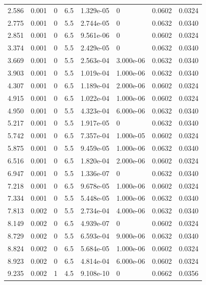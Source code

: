 \documentclass[preview]{standalone}
\begin{document}
{{\begin{tabular}{L{1.2cm}C{1.2cm} C{0.3cm}C{0.5cm} C{1.4cm}C{1.4cm} C{1.4cm}C{1.4cm}}
  2.586  &  0.001  & 0     & 6.5 &  1.329e-05  & 0  & 0.0602 &  0.0324   \\ 
  2.775  &  0.001  & 0     & 5.5 &  2.744e-05  & 0  & 0.0632 &  0.0340   \\ 
  2.851  &  0.001  & 0     & 6.5 &  9.561e-06  & 0  & 0.0602 &  0.0324   \\ 
  3.374  &  0.001  & 0     & 5.5 &  2.429e-05  & 0  & 0.0632 &  0.0340   \\ 
  3.669  &  0.001  & 0     & 5.5 &  2.563e-04  & 3.000e-06  & 0.0632 &  0.0340   \\ 
  3.903  &  0.001  & 0     & 5.5 &  1.019e-04  & 1.000e-06  & 0.0632 &  0.0340   \\ 
  4.307  &  0.001  & 0     & 6.5 &  1.189e-04  & 2.000e-06  & 0.0602 &  0.0324   \\ 
  4.915  &  0.001  & 0     & 6.5 &  1.022e-04  & 1.000e-06  & 0.0602 &  0.0324   \\ 
  4.950  &  0.001  & 0     & 5.5 &  4.323e-04  & 6.000e-06  & 0.0632 &  0.0340   \\ 
  5.217  &  0.001  & 0     & 5.5 &  1.917e-05  & 0  & 0.0632 &  0.0340   \\ 
  5.742  &  0.001  & 0     & 6.5 &  7.357e-04  & 1.000e-05  & 0.0602 &  0.0324   \\ 
  5.875  &  0.001  & 0     & 5.5 &  9.459e-05  & 1.000e-06  & 0.0632 &  0.0340   \\ 
  6.516  &  0.001  & 0     & 6.5 &  1.820e-04  & 2.000e-06  & 0.0602 &  0.0324   \\ 
  6.947  &  0.001  & 0     & 5.5 &  1.336e-07  & 0  & 0.0632 &  0.0340   \\ 
  7.218  &  0.001  & 0     & 6.5 &  9.678e-05  & 1.000e-06  & 0.0602 &  0.0324   \\ 
  7.334  &  0.001  & 0     & 5.5 &  5.448e-05  & 1.000e-06  & 0.0632 &  0.0340   \\ 
  7.813  &  0.002  & 0     & 5.5 &  2.734e-04  & 4.000e-06  & 0.0632 &  0.0340   \\ 
  8.149  &  0.002  & 0     & 6.5 &  4.939e-07  & 0  & 0.0602 &  0.0324   \\ 
  8.729  &  0.002  & 0     & 5.5 &  6.593e-04  & 9.000e-06  & 0.0632 &  0.0340   \\ 
  8.824  &  0.002  & 0     & 6.5 &  5.684e-05  & 1.000e-06  & 0.0602 &  0.0324   \\ 
  8.923  &  0.002  & 0     & 6.5 &  4.814e-04  & 6.000e-06  & 0.0602 &  0.0324   \\ 
  9.235  &  0.002  & 1     & 4.5 &  9.108e-10  & 0  & 0.0662 &  0.0356   \\ 

\end{tabular}}}
\end{document}
